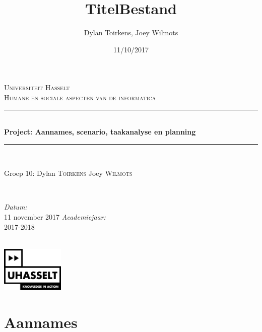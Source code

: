 \documentclass[12pt]{article}
\author{Dylan Toirkens, Joey Wilmots}
\title{\textbf{TitelBestand}}
\date{11/10/2017}
\begin{document}
	\begin{titlepage}
		
		\newcommand{\HRule}{\rule{\linewidth}{0.5mm}} %
		
		\begin{center} %
			
			\textsc{\LARGE Universiteit Hasselt}\\[1.5cm] %
			\textsc{\Large Humane en sociale aspecten van de informatica}\\[0.5cm] %
			
			\HRule \\[0.4cm]
			{ \huge \bfseries Project: Aannames, scenario, taakanalyse en planning}\\[0.4cm]
			\HRule \\[1.5cm]
			
			\begin{minipage}{0.5\textwidth}
				\begin{flushleft} \large
					Groep 10:\newline
					Dylan \textsc{Toirkens}\newline
					Joey \textsc{Wilmots}
				\end{flushleft}
			\end{minipage}
			~
			\begin{minipage}{0.3\textwidth}
				\begin{flushright} \large
					\emph{Datum:}\\
					11 november 2017
					\emph{Academiejaar: } \\
					2017-2018
				\end{flushright}
			\end{minipage}\\[3cm]
			\vspace{25 mm}
			\includegraphics[width=3.0cm]{UHasselt-logo.jpg}\\[2.0cm]  
		\end{center}
	\end{titlepage}
\newpage
\tableofcontents
\clearpage

\section{Aannames}
\end{document}
